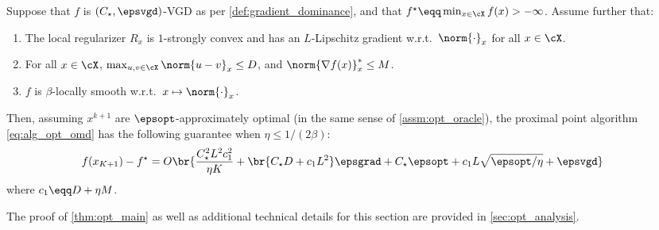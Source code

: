 \begin{theorem}\label{thm:opt_main}
    Suppose that $f$ is $(C_\star, \epsvgd)$-VGD as per \cref{def:gradient_dominance}, and that $f^\star \eqq \min_{x\in \cX}f(x) > -\infty$. 
    Assume further that:
    \begin{enumerate}[label=(\roman*)]
        \item The local regularizer $R_x$ is $1$-strongly convex and has an $L$-Lipschitz gradient w.r.t.~$\norm{\cdot}_x$ for all $x\in \cX$.
        
        \item For all $x\in \cX$, 
        $\max_{u,v\in \cX}\norm{u - v}_x\leq D$, and
        $\norm{\nabla f(x)}^*_x \leq M$.
        
        \item $f$ is $\beta$-locally smooth w.r.t.~$x \mapsto \norm{\cdot}_{x}$. 
    \end{enumerate}
    Then, assuming $x^{k+1}$ are $\epsopt$-approximately optimal (in the same sense of \cref{assm:opt_oracle}),
    the proximal point algorithm \cref{eq:alg_opt_omd}
	has the following guarantee when $\eta\leq 1/(2\beta)$:
    \begin{align*}
		f(x_{K+1}) - f^\star 
		&= O\br{\frac{C_\star^2 L^2 c_1^2}{\eta K}
            + \br{C_\star D + c_1 L^2}\epsgrad
                + C_\star \epsopt 
                + c_1 L \sqrt{\epsopt/\eta}
            + \epsvgd
            }
        \end{align*}
	where $c_1 \eqq D + \eta M$.
    
    
\end{theorem}
The proof of \cref{thm:opt_main} as well as additional technical details for this section are provided in 
\cref{sec:opt_analysis}.
